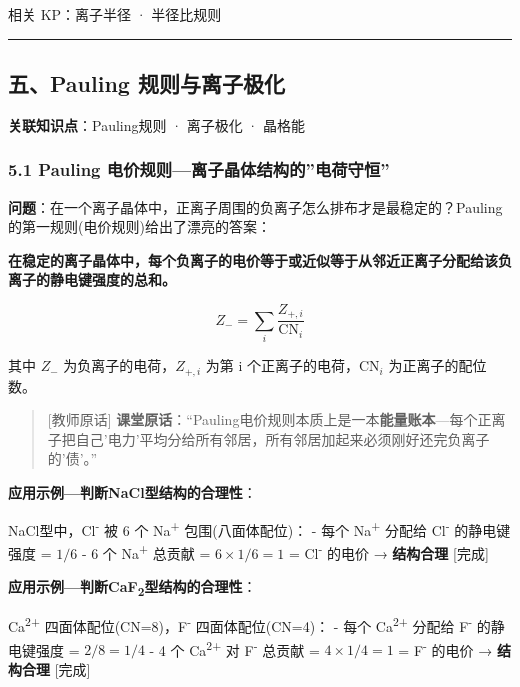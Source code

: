 相关 KP：离子半径 · 半径比规则

\begin{center}\rule{0.5\linewidth}{0.5pt}\end{center}

\subsection{五、Pauling 规则与离子极化}\label{ux4e94pauling-ux89c4ux5219ux4e0eux79bbux5b50ux6781ux5316}

\textbf{关联知识点}：Pauling规则 · 离子极化 · 晶格能

\subsubsection{5.1 Pauling 电价规则---离子晶体结构的''电荷守恒''}\label{pauling-ux7535ux4ef7ux89c4ux5219ux79bbux5b50ux6676ux4f53ux7ed3ux6784ux7684ux7535ux8377ux5b88ux6052}

\textbf{问题}：在一个离子晶体中，正离子周围的负离子怎么排布才是最稳定的？Pauling 的第一规则(电价规则)给出了漂亮的答案：

\textbf{在稳定的离子晶体中，每个负离子的电价等于或近似等于从邻近正离子分配给该负离子的静电键强度的总和。}

\[
Z_- = \sum_i \frac{Z_{+,i}}{\text{CN}_i}
\]

其中 \(Z_-\) 为负离子的电荷，\(Z_{+,i}\) 为第 i 个正离子的电荷，\(\text{CN}_i\) 为正离子的配位数。

\begin{quote}
{[}教师原话{]} \textbf{课堂原话}：``Pauling电价规则本质上是一本\textbf{能量账本}---每个正离子把自己'电力'平均分给所有邻居，所有邻居加起来必须刚好还完负离子的'债'。''
\end{quote}

\textbf{应用示例---判断NaCl型结构的合理性}：

NaCl型中，Cl\textsuperscript{-} 被 6 个 Na\textsuperscript{+} 包围(八面体配位)：
- 每个 Na\textsuperscript{+} 分配给 Cl\textsuperscript{-} 的静电键强度 = \(1/6\)
- 6 个 Na\textsuperscript{+} 总贡献 = \(6 \times 1/6 = 1\) = Cl\textsuperscript{-} 的电价 → \textbf{结构合理} {[}完成{]}

\textbf{应用示例---判断CaF\textsubscript{2}型结构的合理性}：

Ca\textsuperscript{2+} 四面体配位(CN=8)，F\textsuperscript{-} 四面体配位(CN=4)：
- 每个 Ca\textsuperscript{2+} 分配给 F\textsuperscript{-} 的静电键强度 = \(2/8 = 1/4\)
- 4 个 Ca\textsuperscript{2+} 对 F\textsuperscript{-} 总贡献 = \(4 \times 1/4 = 1\) = F\textsuperscript{-} 的电价 → \textbf{结构合理} {[}完成{]}

